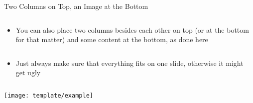 \documentclass{rhsleek}
\begin{document}
\begin{slide}{Two Columns on Top, an Image at the Bottom}
	\begin{column}
		\begin{itemize}
			\item You can also place two columns besides each other on top (or at the bottom for that matter) and some content at the bottom, as done here
		\end{itemize}
	\end{column}
	\begin{column}
		\begin{itemize}
			\item Just always make sure that everything fits on one slide, otherwise it might get ugly
		\end{itemize}
	\end{column}
	\begin{center}
		\texttt{[image: template/example]}
	\end{center}
\end{slide}
\end{document}

